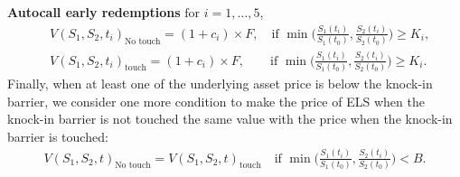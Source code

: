 \documentclass[11pt,reqno]{article}
\numberwithin{equation}{section}
\begin{document}
{\noindent\textbf{Autocall early redemptions}
%
\qquad $\mbox{for } i = 1, \ldots, 5$,
\begin{equation*}
\begin{aligned}
    & V(S_1,S_2,t_i)_{\text{No touch}} = 
    (1 + c_i) \times F,
    \quad \mbox{if } 
    \min \bigg(\frac{S_1(t_i)}{S_1(t_0)}, \frac{S_2(t_i)}{S_2(t_0)} \bigg) 
    \ge K_i, \\
    & V(S_1,S_2,t_i)_{\text{touch}} = 
    (1 + c_i) \times F,
    \qquad \mbox{if } 
    \min \bigg(\frac{S_1(t_i)}{S_1(t_0)}, \frac{S_2(t_i)}{S_2(t_0)} \bigg) 
    \ge K_i.
\end{aligned}
\end{equation*}
Finally, when at least one of the underlying asset price is below the knock-in barrier, we consider one more condition to make the price of ELS when the knock-in barrier is not touched the same value with the price when the knock-in barrier is touched:
\begin{equation*}
\begin{aligned}
    V(S_1,S_2,t)_{\text{No touch}}
    = V(S_1,S_2,t)_{\text{touch}}
    \quad \mbox{if } 
    \min \bigg(\frac{S_1(t_i)}{S_1(t_0)}, \frac{S_2(t_i)}{S_2(t_0)} \bigg) 
    < B.
\end{aligned}
\end{equation*}
}
\end{document}
